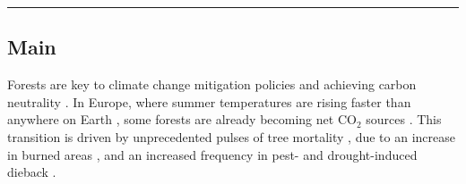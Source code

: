 \documentclass[11pt,letter]{article}
\begin{document}

\noindent\rule{\textwidth}{0.3pt}

\linenumbers

\subsection*{Main}

Forests are key to climate change mitigation policies and achieving carbon neutrality  \citep{Korosuo2023, Hyyrynen2023}. In Europe, where summer temperatures are rising faster than anywhere on Earth \citep{CCCS2024}, some forests are already becoming net CO$_2$ sources \citep{Hadden2016, Karelin2021}. This transition is driven by unprecedented pulses of tree mortality \citep{Senf2020}, due to an increase in  burned areas \citep{Carnicer2022, Kelly2024}, and an increased frequency in pest- and drought-induced dieback \citep{Karelin2021, Cienciala2024, Latifovic2024}.
\end{document}
